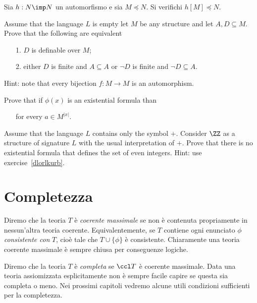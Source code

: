 \begin{exercise}
Sia $h:N\imp N$ un automorfismo e sia $M\preceq N$. Si verifichi $h[M]\preceq N$.\QED
\end{exercise}

\begin{exercise}
Assume that the language $L$ is empty let $M$ be any structure and let $A,D\subseteq M$. Prove that the following are equivalent
\begin{itemize}
 \item[1.] $D$ is definable over $M$;
 \item[2.] either $D$ is finite and $A\subseteq A$ or $\neg D$ is finite and $\neg D\subseteq A$.
\end{itemize}
Hint: note that every bijection $f:M\to M$ is an automorphism.\QED
\end{exercise}

\begin{exercise}\label{dlorlkurb}
Prove that if $\phi(x)$ is an existential formula than 
\begin{itemize}
\item[] for every $a\in M^{|x|}$.
\end{itemize}
\end{exercise}

\begin{exercise}
Assume that the language $L$ contains only the symbol $+$. Consider $\ZZ$ as a structure of signature $L$ with the usual interpretation of $+$. Prove that there is no existential formula that defines the set of even integers. Hint: use exercise~\ref{dlorlkurb}.\QED
\end{exercise}




\section{Completezza}
Diremo che la teoria $T$ \`e \emph{coerente massimale\/} se non \`e contenuta propriamente in nessun'altra teoria coerente. Equivalentemente, se $T$ contiene ogni enunciato $\phi$ \emph{consistente con\/} $T$, cio\`e tale che $T\cup\{\phi\}$ \`e consistente. Chiaramente una teoria coerente massimale \`e sempre chiusa per conseguenze logiche.

Diremo che la teoria $T$ \`e \emph{completa\/} se $\ccl T$ \`e coerente massimale. Data una teoria assiomizzata esplicitamente non \`e sempre facile capire se questa sia completa o meno. Nei prossimi capitoli vedremo alcune utili condizioni sufficienti per la completezza.

